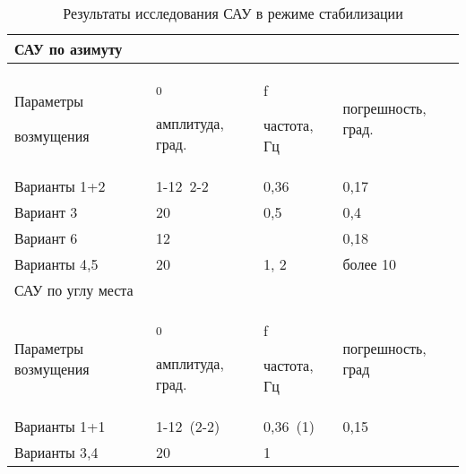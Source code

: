 \begin{table}[h]
	\centering
	\caption{Результаты исследования САУ в режиме стабилизации}
	\begin{tabular}{p{1.28in}p{1.47in}p{1.08in}p{1.67in}}
		\hline
		\multicolumn{4}{|p{6.1in}|}{САУ по азимуту} \\
		\hline
		\multicolumn{1}{|p{1.28in}}{Параметры \par возмущения} & 
		\multicolumn{1}{|p{1.47in}}{\textsubscript{0 } \par амплитуда, град.} & 
		\multicolumn{1}{|p{1.08in}}{f \par частота, Гц} & 
		\multicolumn{1}{|p{1.67in}|}{погрешность, град. \par } \\
		\hline
		\multicolumn{1}{|p{1.28in}}{Варианты 1+2} & 
		\multicolumn{1}{|p{1.47in}}{1-12\  2-2} & 
		\multicolumn{1}{|p{1.08in}}{0,36} & 
		\multicolumn{1}{|p{1.67in}|}{0,17} \\
		\hline
		\multicolumn{1}{|p{1.28in}}{Вариант 3} & 
		\multicolumn{1}{|p{1.47in}}{20} & 
		\multicolumn{1}{|p{1.08in}}{0,5} & 
		\multicolumn{1}{|p{1.67in}|}{0,4} \\
		\hline
		\multicolumn{1}{|p{1.28in}}{Вариант 6} & 
		\multicolumn{1}{|p{1.47in}}{12} & 
		\multicolumn{1}{|p{1.08in}}{} & 
		\multicolumn{1}{|p{1.67in}|}{0,18} \\
		\hline
		\multicolumn{1}{|p{1.28in}}{Варианты 4,5} & 
		\multicolumn{1}{|p{1.47in}}{20} & 
		\multicolumn{1}{|p{1.08in}}{1, 2} & 
		\multicolumn{1}{|p{1.67in}|}{более 10} \\
		\hline
		\multicolumn{4}{|p{6.1in}|}{САУ по углу места} \\
		\hline
		\multicolumn{1}{|p{1.37in}}{Параметры возмущения} & 
		\multicolumn{1}{|p{1.47in}}{\textsubscript{0}  \par амплитуда, град.} & 
		\multicolumn{1}{|p{1.18in}}{f \par частота, Гц} & 
		\multicolumn{1}{|p{1.47in}|}{погрешность, град \par } \\
		\hline
		\multicolumn{1}{|p{1.37in}}{Варианты 1+1} & 
		\multicolumn{1}{|p{1.47in}}{ 1-12\  (2-2)} & 
		\multicolumn{1}{|p{1.18in}}{ 0,36\  (1)} & 
		\multicolumn{1}{|p{1.47in}|}{ 0,15} \\
		\hline
		\multicolumn{1}{|p{1.37in}}{Варианты 3,4} & 
		\multicolumn{1}{|p{1.47in}}{ 20} & 
		\multicolumn{1}{|p{1.18in}}{ 1} & 

\end{tabular}
\end{table}

